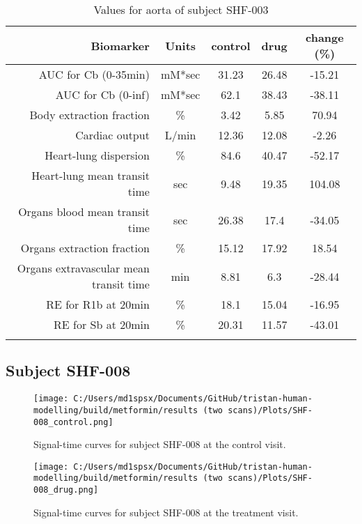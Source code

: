 \documentclass{epflreport}%
\begin{document}
\begin{longtable}{rcccc}%
\hline%
Biomarker&Units&control&drug&change (\%)\\%
\hline%
AUC for Cb (0{-}35min)&mM*sec&31.23&26.48&{-}15.21\\%
AUC for Cb (0{-}inf)&mM*sec&62.1&38.43&{-}38.11\\%
Body extraction fraction&\%&3.42&5.85&70.94\\%
Cardiac output&L/min&12.36&12.08&{-}2.26\\%
Heart{-}lung dispersion&\%&84.6&40.47&{-}52.17\\%
Heart{-}lung mean transit time&sec&9.48&19.35&104.08\\%
Organs blood mean transit time&sec&26.38&17.4&{-}34.05\\%
Organs extraction fraction&\%&15.12&17.92&18.54\\%
Organs extravascular mean transit time&min&8.81&6.3&{-}28.44\\%
RE for R1b at 20min&\%&18.1&15.04&{-}16.95\\%
RE for Sb at 20min&\%&20.31&11.57&{-}43.01\\%
\hline%
\caption{Values for aorta of subject SHF-003} \\%
\end{longtable}%
\clearpage%
\subsection{Subject SHF{-}008}%
\label{subsec:SubjectSHF{-}008}%

%


\begin{figure}[h!]%
\centering%
\texttt{[image: C:/Users/md1spsx/Documents/GitHub/tristan-human-modelling/build/metformin/results (two scans)/Plots/SHF-008\_control.png]}%
\caption{Signal{-}time curves for subject SHF{-}008 at the control visit.}%
\end{figure}

%


\begin{figure}[h!]%
\centering%
\texttt{[image: C:/Users/md1spsx/Documents/GitHub/tristan-human-modelling/build/metformin/results (two scans)/Plots/SHF-008\_drug.png]}%
\caption{Signal{-}time curves for subject SHF{-}008 at the treatment visit.}%
\end{figure}
\end{document}
